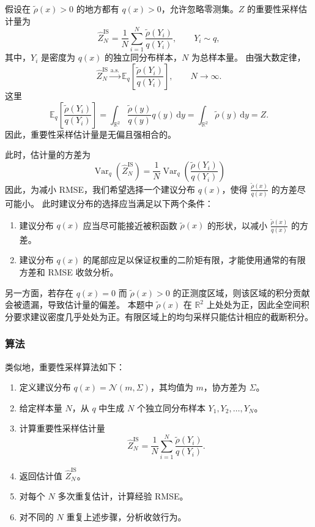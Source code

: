 \documentclass[12pt,a4paper]{ctexart}
\newcommand{\R}{\mathbb{R}}
\newcommand{\E}{\mathbb{E}}
\DeclareMathOperator{\Var}{Var}
\newcommand{\rhoT}{\widetilde{\rho}}
\begin{document}
假设在 $\rhoT(x)>0$ 的地方都有 $q(x)>0$，允许忽略零测集。$Z$ 的重要性采样估计量为
\[
\widehat Z_N^{\mathrm{IS}}=\frac1N\sum_{i=1}^N\frac{\rhoT(Y_i)}{q(Y_i)},
\qquad Y_i\sim q,
\]
其中，$Y_i$ 是密度为 $q(x)$ 的独立同分布样本，$N$ 为总样本量。
由强大数定律，
\[
\widehat Z_N^{\mathrm{IS}}\xrightarrow{\text{a.s.}}
  \E_q\left[\frac{\rhoT(Y_i)}{q(Y_i)}\right],\qquad N\to\infty.
\]
这里
\[
\E_q\left[\frac{\rhoT(Y_i)}{q(Y_i)}\right]
=\int_{\R^2}\frac{\rhoT(y)}{q(y)}q(y)\,\mathrm{d}y
=\int_{\R^2}\rhoT(y)\,\mathrm{d}y=Z.
\]
因此，重要性采样估计量是无偏且强相合的。

此时，估计量的方差为
\[
\Var_q(\widehat Z_N^{\mathrm{IS}})=\frac1N\Var_q\left(\frac{\rhoT(Y_i)}{q(Y_i)}\right)
\]
因此，为减小 RMSE，我们希望选择一个建议分布 $q(x)$，使得 $\frac{\rhoT(x)}{q(x)}$ 的方差尽可能小。
此时建议分布的选择应当满足以下两个条件：
\begin{enumerate}
    \item 建议分布 $q(x)$ 应当尽可能接近被积函数 $\rhoT(x)$ 的形状，以减小 $\frac{\rhoT(x)}{q(x)}$ 的方差。
    \item 建议分布 $q(x)$ 的尾部应足以保证权重的二阶矩有限，才能使用通常的有限方差和 RMSE 收敛分析。
\end{enumerate}

另一方面，若存在 $q(x)=0$ 而 $\rhoT(x)>0$ 的正测度区域，则该区域的积分贡献会被遗漏，导致估计量的偏差。
本题中 $\rhoT(x)$ 在 $\R^2$ 上处处为正，因此全空间积分要求建议密度几乎处处为正。有限区域上的均匀采样只能估计相应的截断积分。

\subsubsection{算法}

类似地，重要性采样算法如下：
\begin{enumerate}
  \item 定义建议分布 $q(x)=\mathcal{N}(m,\Sigma)$，其均值为 $m$，协方差为 $\Sigma$。
  \item 给定样本量 $N$，从 $q$ 中生成 $N$ 个独立同分布样本 $Y_1,Y_2,\ldots,Y_N$。
  \item 计算重要性采样估计量
    \[\widehat Z_N^{\mathrm{IS}}=\frac1N\sum_{i=1}^N\frac{\rhoT(Y_i)}{q(Y_i)}.\]
  \item 返回估计值 $\widehat Z_N^{\mathrm{IS}}$。
  \item 对每个 $N$ 多次重复估计，计算经验 RMSE。
  \item 对不同的 $N$ 重复上述步骤，分析收敛行为。
\end{enumerate}
\end{document}
